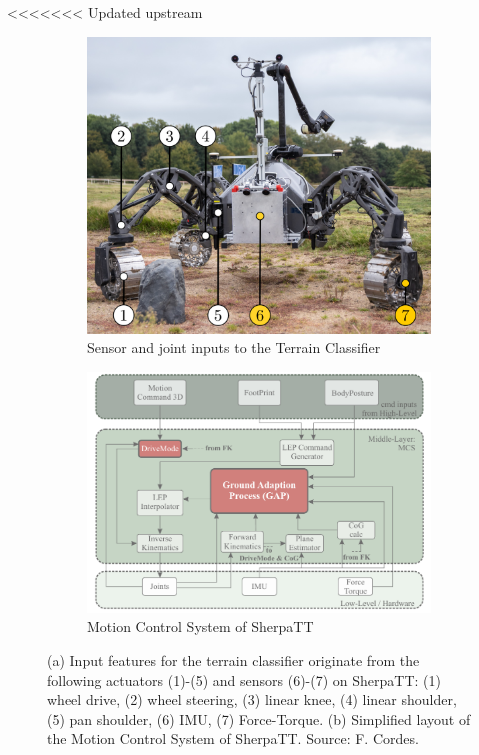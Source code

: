 \documentclass{article}
\begin{document}
 
 


<<<<<<< Updated upstream
\begin{figure}[!htb]
    \begin{subfigure}[t]{0.44\textwidth}
        \includegraphics[width=\textwidth]{../figures/terrain_classifier_sensor_inputs.png}
        \caption{\label{fig:SensorInputs}Sensor and joint inputs to the Terrain Classifier}
    \end{subfigure}
    \begin{subfigure}[t]{0.55\textwidth}
        \includegraphics[width=\textwidth]{../figures/MCS-Structure.pdf}
        \caption{\label{fig:MCS}Motion Control System of SherpaTT \cite{cordes_phd_2018}}
    \end{subfigure}
     \caption{\label{fig:Loco}(a) Input features for the terrain classifier originate from the following actuators (1)-(5) and sensors (6)-(7) on SherpaTT: (1) wheel drive, (2) wheel steering, (3) linear knee, (4) linear shoulder, (5) pan shoulder, (6) IMU, (7) Force-Torque. (b) Simplified layout of the Motion Control System of SherpaTT. Source: F. Cordes.}
\end{figure}
\end{document}
